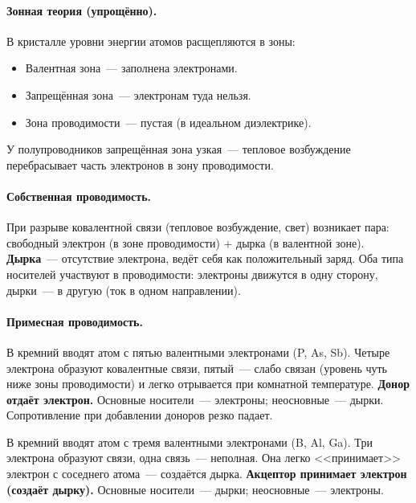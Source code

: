 \documentclass[12pt]{article}
\begin{document}
\paragraph{Зонная теория (упрощённо).}
В кристалле уровни энергии атомов расщепляются в зоны:
\begin{itemize}
	\item Валентная зона~--- заполнена электронами.
	\item Запрещённая зона~--- электронам туда нельзя.
	\item Зона проводимости~--- пустая (в идеальном диэлектрике).
\end{itemize}
У полупроводников запрещённая зона узкая~--- тепловое возбуждение перебрасывает часть электронов в зону проводимости.

\paragraph{Собственная проводимость.}
При разрыве ковалентной связи (тепловое возбуждение, свет) возникает пара: свободный электрон (в зоне проводимости) + дырка (в валентной зоне). \textbf{Дырка}~--- отсутствие электрона, ведёт себя как положительный заряд. Оба типа носителей участвуют в проводимости: электроны движутся в одну сторону, дырки~--- в другую (ток в одном направлении).

\paragraph{Примесная проводимость.}

\begin{definition}
	В кремний вводят атом с пятью валентными электронами (P, As, Sb). Четыре электрона образуют ковалентные связи, пятый~--- слабо связан (уровень чуть ниже зоны проводимости) и легко отрывается при комнатной температуре. \textbf{Донор отдаёт электрон.} Основные носители~--- электроны; неосновные~--- дырки. Сопротивление при добавлении доноров резко падает.
\end{definition}

\begin{definition}
	В кремний вводят атом с тремя валентными электронами (B, Al, Ga). Три электрона образуют связи, одна связь~--- неполная. Она легко <<принимает>> электрон с соседнего атома~--- создаётся дырка. \textbf{Акцептор принимает электрон (создаёт дырку).} Основные носители~--- дырки; неосновные~--- электроны.
\end{definition}
\end{document}
